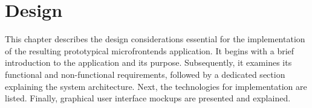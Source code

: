 \chapter{Design}
\label{chap:Design} 
This chapter describes the design considerations essential for the implementation of the resulting prototypical microfrontends application. It begins with a brief introduction to the application and its purpose. Subsequently, it examines its functional and non-functional requirements, followed by a dedicated section explaining the system architecture. Next, the technologies for implementation are listed. Finally, graphical user interface mockups are presented and explained.





